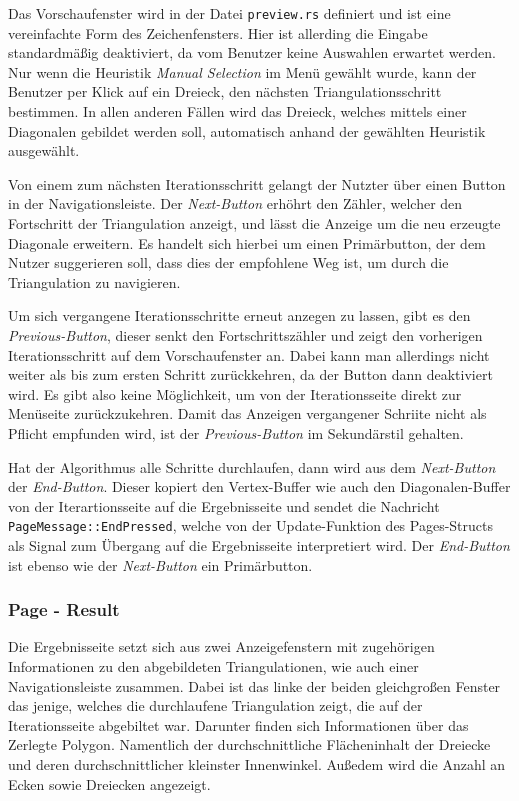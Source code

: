 Das Vorschaufenster wird in der Datei \lstinline{preview.rs} definiert und ist eine vereinfachte Form des Zeichenfensters. Hier ist allerding die Eingabe standardmäßig deaktiviert, da vom Benutzer keine 
Auswahlen erwartet werden. Nur wenn die Heuristik \emph{Manual Selection} im Menü gewählt wurde, kann der Benutzer per Klick auf ein Dreieck, den nächsten Triangulationsschritt bestimmen.
In allen anderen Fällen wird das Dreieck, welches mittels einer Diagonalen gebildet werden soll, automatisch anhand der gewählten Heuristik ausgewählt.

Von einem zum nächsten Iterationsschritt gelangt der Nutzter über einen Button in der Navigationsleiste. Der \emph{Next-Button} erhöhrt den Zähler, welcher den Fortschritt der Triangulation anzeigt, 
und lässt die Anzeige um die neu erzeugte Diagonale erweitern. Es handelt sich hierbei um einen Primärbutton, der dem Nutzer suggerieren soll, dass dies der empfohlene Weg ist, um durch die Triangulation zu navigieren.

Um sich vergangene Iterationsschritte erneut anzegen zu lassen, gibt es den \emph{Previous-Button}, dieser senkt den Fortschrittszähler und zeigt den vorherigen Iterationsschritt auf dem Vorschaufenster an.
Dabei kann man allerdings nicht weiter als bis zum ersten Schritt zurückkehren, da der Button dann deaktiviert wird. Es gibt also keine Möglichkeit, um von der Iterationsseite direkt zur Menüseite zurückzukehren.
Damit das Anzeigen vergangener Schriite nicht als Pflicht empfunden wird, ist der \emph{Previous-Button} im Sekundärstil gehalten.

Hat der Algorithmus alle Schritte durchlaufen, dann wird aus dem \emph{Next-Button} der \emph{End-Button}. Dieser kopiert den Vertex-Buffer wie auch den Diagonalen-Buffer von der Iterartionsseite auf die Ergebnisseite 
und sendet die Nachricht \lstinline{PageMessage::EndPressed}, welche von der Update-Funktion des Pages-Structs als Signal zum Übergang auf die Ergebnisseite interpretiert wird. Der \emph{End-Button} ist ebenso wie der 
\emph{Next-Button} ein Primärbutton.

\subsubsection{Page - Result}

Die Ergebnisseite setzt sich aus zwei Anzeigefenstern mit zugehörigen Informationen zu den abgebildeten Triangulationen, wie auch einer Navigationsleiste zusammen.
Dabei ist das linke der beiden gleichgroßen Fenster das jenige, welches die durchlaufene Triangulation zeigt, die auf der Iterationsseite abgebiltet war. Darunter finden sich 
Informationen über das Zerlegte Polygon. Namentlich der durchschnittliche Flächeninhalt der Dreiecke und deren durchschnittlicher kleinster Innenwinkel. Außedem wird die Anzahl an Ecken sowie Dreiecken angezeigt.

